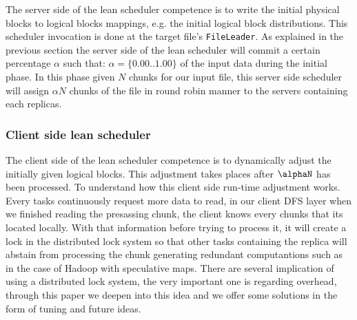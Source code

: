 The server side of the lean scheduler competence is to write the initial
physical blocks to logical blocks mappings, e.g. the initial logical block
distributions. This scheduler invocation is done at the target file's
\texttt{FileLeader}. As explained in the previous section the server side of
the lean scheduler will commit a certain percentage $\alpha$ such that: $\alpha
= \{0.00..1.00\}$ of the input data during the initial phase. In this phase
given $N$ chunks for our input file, this server side scheduler will assign
$\alpha N$ chunks of the file in round robin manner to the servers containing
each replicas. 

\subsubsection{Client side lean scheduler}

The client side of the lean scheduler competence is to dynamically adjust the
initially given logical blocks. This adjustment takes places after $\alphaN$
has been processed. To understand how this client side run-time adjustment
works. Every tasks continuously request more data to read, in our client DFS
layer when we finished reading the presassing chunk, the client knows every
chunks that its located locally. With that information before trying to process
it, it will create a lock in the distributed lock system so that other tasks
containing the replica will abstain from processing the chunk generating
redundant computantions such as in the case of Hadoop with speculative maps.
There are several implication of using a distributed lock system, the very
important one is regarding overhead, through this paper we deepen into this
idea and we offer some solutions in the form of tuning and future ideas.




